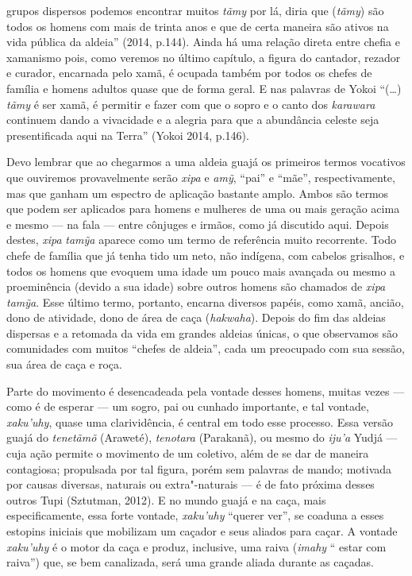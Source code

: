 grupos dispersos podemos encontrar muitos \emph{tãmy} por lá, diria que
(\emph{tãmy}) são todos os homens com mais de trinta anos e que de certa
maneira são ativos na vida pública da aldeia'' (2014, p.144). Ainda há
uma relação direta entre chefia e xamanismo pois, como veremos no último
capítulo, a figura do cantador, rezador e curador, encarnada pelo xamã,
é ocupada também por todos os chefes de família e homens adultos quase
que de forma geral. E nas palavras de Yokoi ``(\ldots{}) \emph{tãmy} é ser
xamã, é permitir e fazer com que o sopro e o canto dos \emph{karawara}
continuem dando a vivacidade e a alegria para que a abundância celeste
seja presentificada aqui na Terra'' (Yokoi 2014, p.146).

Devo lembrar que ao chegarmos a uma aldeia guajá os primeiros termos
vocativos que ouviremos provavelmente serão \emph{xipa} e \emph{amỹ},
``pai'' e ``mãe'', respectivamente, mas que ganham um espectro de
aplicação bastante amplo. Ambos são termos que podem ser aplicados para
homens e mulheres de uma ou mais geração acima e mesmo --- na fala --- entre
cônjuges e irmãos, como já discutido aqui. Depois destes, \emph{xipa}
\emph{tamỹa} aparece como um termo de referência muito recorrente. Todo
chefe de família que já tenha tido um neto, não indígena, com cabelos
grisalhos, e todos os homens que evoquem uma idade um pouco mais
avançada ou mesmo a proeminência (devido a sua idade) sobre outros
homens são chamados de \emph{xipa} \emph{tamỹa}. Esse último termo,
portanto, encarna diversos papéis, como xamã, ancião, dono de atividade,
dono de área de caça (\emph{hakwaha}). Depois do fim das aldeias
dispersas e a retomada da vida em grandes aldeias únicas, o que
observamos são comunidades com muitos ``chefes de aldeia'', cada um
preocupado com sua sessão, sua área de caça e roça.

Parte do movimento é desencadeada pela vontade desses homens, muitas
vezes --- como é de esperar --- um sogro, pai ou cunhado importante, e tal
vontade, \emph{xaku'uhy}, quase uma clarividência, é central em todo
esse processo. Essa versão guajá do \emph{tenetãmõ} (Araweté),
\emph{tenotara} (Parakanã), ou mesmo do \emph{iju'a} Yudjá --- cuja ação
permite o movimento de um coletivo, além de se dar de maneira
contagiosa; propulsada por tal figura, porém sem palavras de mando;
motivada por causas diversas, naturais ou extra"-naturais --- é de fato
próxima desses outros Tupi (Sztutman, 2012). E no mundo guajá e na caça,
mais especificamente, essa forte vontade, \emph{xaku'uhy} ``querer ver'',
se coaduna a esses estopins iniciais que mobilizam um caçador e seus
aliados para caçar. A vontade \emph{xaku'uhy} é o motor da caça e
produz, inclusive, uma raiva (\emph{imahy} `` estar com raiva'') que, se
bem canalizada, será uma grande aliada durante as caçadas.

